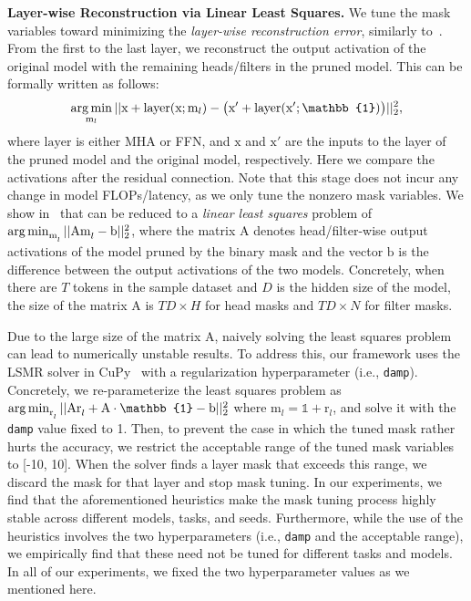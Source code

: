 \textbf{Layer-wise Reconstruction via Linear Least Squares.}
We tune the mask variables toward minimizing the \textit{layer-wise reconstruction error}, similarly to~\cite{he2017channel}.
From the first to the last layer, we reconstruct the output activation of the original model with the remaining heads/filters in the pruned model.
This can be formally written as follows:
\vspace{-1mm}
\begin{gather}
    \argmin_{\text{m}_l} || \text{x}  + \mathrm{layer}(\text{x}; \text{m}_l) - \big(\text{x}' + \mathrm{layer}(\text{x}'; \mathbb{1})\big) ||_2^2, \label{eq:reconstruction}
\end{gather}
where $\mathrm{layer}$ is either MHA or FFN, and $\text{x}$ and $\text{x}'$ are the inputs to the layer of the pruned model and the original model, respectively.
Here we compare the activations after the residual connection.
Note that this stage does not incur any change in model FLOPs/latency, as we only tune the nonzero mask variables.
We show in~ that  can be reduced to a \textit{linear least squares} problem of
$\operatorname*{arg\,min}_{\text{m}^{}_l} || \text{A} \text{m}^{}_l - \text{b}  ||_2^2$, where the matrix $\text{A}$ denotes head/filter-wise output activations of the model pruned by the binary mask and the vector $\text{b}$ is the difference between the output activations of the two models.
Concretely, when there are $T$ tokens in the sample dataset and $D$ is the hidden size of the model, the size of the matrix $\text{A}$ is $TD \times H$ for head masks and $TD \times N$ for filter masks.

Due to the large size of the matrix $\text{A}$, naively solving the least squares problem can lead to numerically unstable results.
To address this, our framework uses the LSMR solver in CuPy~\cite{nishino2017cupy} with a regularization hyperparameter (i.e., \texttt{damp}).
Concretely, we re-parameterize the least squares problem as $\argmin_{\text{r}^{}_l} || \text{A} \text{r}^{}_l + \text{A} \cdot \mathbb{1} - \text{b}  ||_2^2$ where $\text{m}_l =  \mathbb{1} + \text{r}_l$, and solve it with the \texttt{damp} value fixed to 1.
Then, to prevent the case in which the tuned mask rather hurts the accuracy, we restrict the acceptable range of the tuned mask variables to [-10, 10].
When the solver finds a layer mask that exceeds this range, we discard the mask for that layer and stop mask tuning.
In our experiments, we find that the aforementioned heuristics make the mask tuning process highly stable across different models, tasks, and seeds. 
Furthermore, while the use of the heuristics involves the two hyperparameters (i.e., \texttt{damp} and the acceptable range), we empirically find that these need not be tuned for different tasks and models.
In all of our experiments, we fixed the two hyperparameter values as we mentioned here.


